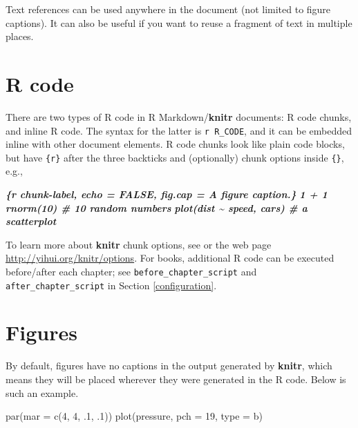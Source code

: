 \documentclass[
  12pt,
]{krantz}
\newenvironment{Shaded}{\begin{snugshade}}{\end{snugshade}}
\newcommand{\AttributeTok}[1]{\textcolor[rgb]{0.77,0.63,0.00}{#1}}
\newcommand{\DecValTok}[1]{\textcolor[rgb]{0.00,0.00,0.81}{#1}}
\newcommand{\FunctionTok}[1]{\textcolor[rgb]{0.00,0.00,0.00}{#1}}
\newcommand{\InformationTok}[1]{\textcolor[rgb]{0.56,0.35,0.01}{\textbf{\textit{#1}}}}
\newcommand{\NormalTok}[1]{#1}
\newcommand{\StringTok}[1]{\textcolor[rgb]{0.31,0.60,0.02}{#1}}
\theoremstyle{definition}
\theoremstyle{definition}
\theoremstyle{definition}
\theoremstyle{definition}
\theoremstyle{remark}
\begin{document}
Text references can be used anywhere in the document (not limited to figure captions). It can also be useful if you want to reuse a fragment of text in multiple places.

\hypertarget{r-code}{%
\section{R code}\label{r-code}}

There are two types of R code in R Markdown/\textbf{knitr} documents: R code chunks, and inline R code. The syntax for the latter is \texttt{\textasciigrave{}r\ R\_CODE\textasciigrave{}}, and it can be embedded inline with other document elements. R code chunks look like plain code blocks, but have \texttt{\{r\}} after the three backticks and (optionally) chunk options inside \texttt{\{\}}, e.g.,

\begin{Shaded}
\begin{Highlighting}[]
\InformationTok{\textasciigrave{}\textasciigrave{}\textasciigrave{}\{r chunk{-}label, echo = FALSE, fig.cap = \textquotesingle{}A figure caption.\textquotesingle{}\}}
\InformationTok{1 + 1}
\InformationTok{rnorm(10)  \# 10 random numbers}
\InformationTok{plot(dist \textasciitilde{} speed, cars)  \# a scatterplot}
\InformationTok{\textasciigrave{}\textasciigrave{}\textasciigrave{}}
\end{Highlighting}
\end{Shaded}

To learn more about \textbf{knitr} chunk options, see \citet{xie2015} or the web page \url{http://yihui.org/knitr/options}. For books, additional R code can be executed before/after each chapter; see \texttt{before\_chapter\_script} and \texttt{after\_chapter\_script} in Section \ref{configuration}.

\hypertarget{figures}{%
\section{Figures}\label{figures}}

By default, figures have no captions in the output generated by \textbf{knitr}, which means they will be placed wherever they were generated in the R code. Below is such an example.

\begin{Shaded}
\begin{Highlighting}[]
\FunctionTok{par}\NormalTok{(}\AttributeTok{mar =} \FunctionTok{c}\NormalTok{(}\DecValTok{4}\NormalTok{, }\DecValTok{4}\NormalTok{, .}\DecValTok{1}\NormalTok{, .}\DecValTok{1}\NormalTok{))}
\FunctionTok{plot}\NormalTok{(pressure, }\AttributeTok{pch =} \DecValTok{19}\NormalTok{, }\AttributeTok{type =} \StringTok{\textquotesingle{}b\textquotesingle{}}\NormalTok{)}
\end{Highlighting}
\end{Shaded}
\end{document}
